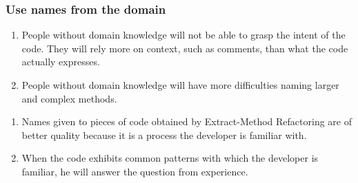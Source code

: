 \subsubsection{Use names from the domain}
\begin{enumerate}
\item People without domain knowledge will not be able to grasp the intent of the code. They will rely more on context, such as comments, than what the code actually expresses.

\item People without domain knowledge will have more difficulties naming larger and complex methods.
\end{enumerate}

\begin{enumerate}





\item Names given to pieces of code obtained by Extract-Method Refactoring are of better quality because it is a process the developer is familiar with.
\item When the code exhibits common patterns with which the developer is familiar, he will answer the question from experience. 
\end{enumerate}


